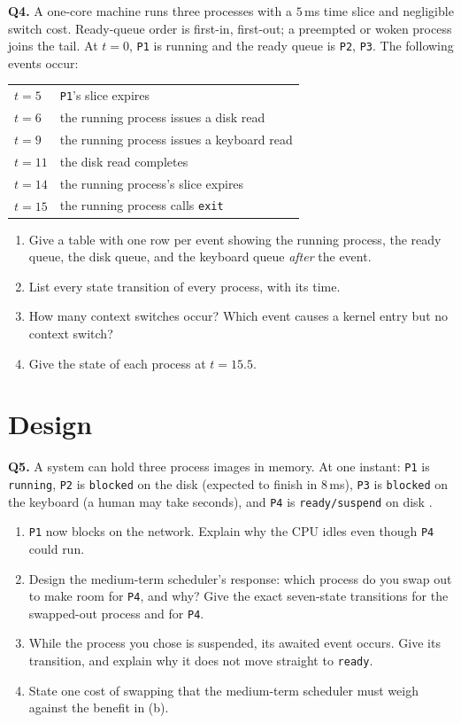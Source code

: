 \documentclass[11pt]{article}
\begin{document}
\textbf{Q4.} A one-core machine runs three processes with a $5$\,ms time slice and negligible switch cost. Ready-queue order is first-in, first-out; a preempted or woken process joins the tail. At $t = 0$, \texttt{P1} is running and the ready queue is \texttt{P2}, \texttt{P3}. The following events occur:
\begin{center}
\begin{tabular}{@{}ll@{}}
$t = 5$ & \texttt{P1}'s slice expires \\
$t = 6$ & the running process issues a disk read \\
$t = 9$ & the running process issues a keyboard read \\
$t = 11$ & the disk read completes \\
$t = 14$ & the running process's slice expires \\
$t = 15$ & the running process calls \texttt{exit} \\
\end{tabular}
\end{center}
\begin{enumerate}
  \item[(a)] Give a table with one row per event showing the running process, the ready queue, the disk queue, and the keyboard queue \emph{after} the event.
  \item[(b)] List every state transition of every process, with its time.
  \item[(c)] How many context switches occur? Which event causes a kernel entry but no context switch?
  \item[(d)] Give the state of each process at $t = 15.5$.
\end{enumerate}

\section{Design}

\textbf{Q5.} A system can hold three process images in memory. At one instant: \texttt{P1} is \texttt{running}, \texttt{P2} is \texttt{blocked} on the disk (expected to finish in $8$\,ms), \texttt{P3} is \texttt{blocked} on the keyboard (a human may take seconds), and \texttt{P4} is \texttt{ready/suspend} on disk \cite{StallingsOS_internals_design_principles}.
\begin{enumerate}
  \item[(a)] \texttt{P1} now blocks on the network. Explain why the CPU idles even though \texttt{P4} could run.
  \item[(b)] Design the medium-term scheduler's response: which process do you swap out to make room for \texttt{P4}, and why? Give the exact seven-state transitions for the swapped-out process and for \texttt{P4}.
  \item[(c)] While the process you chose is suspended, its awaited event occurs. Give its transition, and explain why it does not move straight to \texttt{ready}.
  \item[(d)] State one cost of swapping that the medium-term scheduler must weigh against the benefit in (b).
\end{enumerate}
\end{document}

